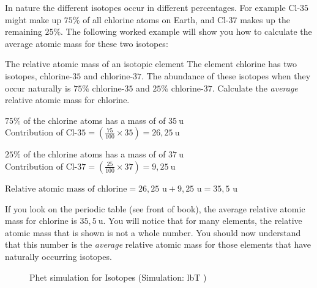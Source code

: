 
\label{m38753*id248557}In nature the different isotopes occur in different percentages. For example $\text{Cl-}35$ might make up $75\%$ of all chlorine atoms on Earth, and $\text{Cl-}37$ makes up the remaining $25\%$. The following worked example will show you how to calculate the average atomic mass for these two isotopes: \par    
\begin{wex}{The relative atomic mass of an isotopic element}{
The element chlorine has two isotopes, $\text{chlorine-}35$ and $\text{chlorine-}37$. The abundance of these isotopes when they occur naturally is $75\%$ $\text{chlorine-}35$ and $25\%$ $\text{chlorine-}37$. Calculate the \textit{average} relative atomic mass for chlorine.
}
{
$75\%$ of the chlorine atoms has a mass of of $35~\text{u}$ \\
Contribution of $\text{Cl-}35 = (\frac{75}{100} \times 35) = 26,25~\text{u}$

$25\%$ of the chlorine atoms has a mass of of $37~\text{u}$ \\ 
Contribution of $\text{Cl-}37 = (\frac{25}{100} \times 37) = 9,25~\text{u}$



$\text{Relative atomic mass of chlorine} = 26,25\text{ u} + 9,25\text{ u} = 35,5\text{ u}$ \\
}
\end{wex}
If you look on the periodic table (see front of book), the average relative atomic mass for chlorine is $35,5~\text{u}$. You will notice that for many elements, the relative atomic mass that is shown is not a whole number. You should now understand that this number is the \textit{average} relative atomic mass for those elements that have naturally occurring isotopes. \par

    \setcounter{subfigure}{0}
	\begin{figure}[H] %
    \textnormal{Phet simulation for Isotopes} \nopagebreak
  \label{m38806*phet!!!underscore!!!sim}\label{m38806*phet-simulation}
             { (Simulation:  lbT )}
 \end{figure}           \par
\label{m38753*secfhsst!!!underscore!!!id400}



